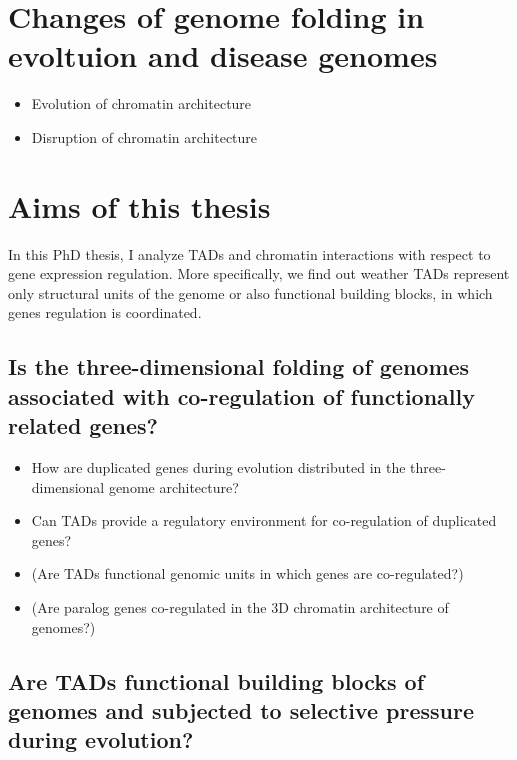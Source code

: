 \documentclass[a4paper,twoside=true,openright,parskip=full,chapterprefix=true,11pt,headings=normal,bibliography=totoc,listof=totoc,titlepage=on,captions=tableabove,draft=false]{scrreprt}
\providecommand{\tightlist}{%
  \setlength{\itemsep}{0pt}\setlength{\parskip}{0pt}}
\theoremstyle{definition}
\theoremstyle{definition}
\theoremstyle{definition}
\theoremstyle{remark}
\begin{document}
\section{Changes of genome folding in evoltuion and disease
genomes}\label{changes-of-genome-folding-in-evoltuion-and-disease-genomes}

\begin{itemize}
\tightlist
\item
  Evolution of chromatin architecture
\item
  Disruption of chromatin architecture
\end{itemize}

\section{Aims of this thesis}\label{aims-of-this-thesis}

In this PhD thesis, I analyze TADs and chromatin interactions with
respect to gene expression regulation. More specifically, we find out
weather TADs represent only structural units of the genome or also
functional building blocks, in which genes regulation is coordinated.

\subsection*{Is the three-dimensional folding of genomes associated with
co-regulation of functionally related
genes?~}\label{is-the-three-dimensional-folding-of-genomes-associated-with-co-regulation-of-functionally-related-genes}

\begin{itemize}
\tightlist
\item
  How are duplicated genes during evolution distributed in the
  three-dimensional genome architecture?
\item
  Can TADs provide a regulatory environment for co-regulation of
  duplicated genes?
\item
  (Are TADs functional genomic units in which genes are co-regulated?)
\item
  (Are paralog genes co-regulated in the 3D chromatin architecture of
  genomes?)
\end{itemize}

\subsection*{Are TADs functional building blocks of genomes and
subjected to selective pressure during
evolution?}\label{are-tads-functional-building-blocks-of-genomes-and-subjected-to-selective-pressure-during-evolution}
\end{document}
